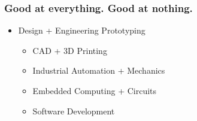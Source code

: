 \documentclass[compress, aspectratio=32]{beamer}
\begin{document}
\begin{frame}
    \frametitle{Good at everything. Good at nothing.}
    \begin{itemize}
        \item Design + Engineering Prototyping
        \begin{itemize}
            \item CAD + 3D Printing
            \item Industrial Automation + Mechanics
            \item Embedded Computing + Circuits
            \item Software Development
        \end{itemize}
    \end{itemize}
\end{frame}
\end{document}

